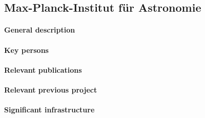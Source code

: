 \subsection{Max-Planck-Institut f\"ur Astronomie}
\label{sec:mpg}

\paragraph{General description}

\paragraph{Key persons}

\paragraph{Relevant publications}

\paragraph{Relevant previous project}

\paragraph{Significant infrastructure}